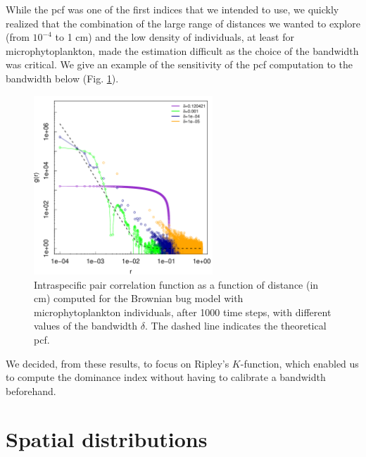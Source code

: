 \documentclass[english]{article}
\begin{document}
While the pcf was one of the first indices that we intended to use,
we quickly realized that the combination of the large range of distances
we wanted to explore (from $10^{-4}$ to 1 cm) and the low density
of individuals, at least for microphytoplankton, made the estimation
difficult as the choice of the bandwidth was critical. We give an
example of the sensitivity of the pcf computation to the bandwidth
below (Fig. \ref{fig:bandwidth_BBM}).

\begin{figure}[H]
\begin{centering}
\includegraphics[width=0.6\textwidth]{../code/figure/bandwidth_BBM}
\par\end{centering}
\caption{Intraspecific pair correlation function as a function of distance
(in cm) computed for the Brownian bug model with microphytoplankton
individuals, after 1000 time steps, with different values of the bandwidth
$\delta$. The dashed line indicates the theoretical pcf.\label{fig:bandwidth_BBM}
}
\end{figure}

We decided, from these results, to focus on Ripley's $K$-function,
which enabled us to compute the dominance index without having to
calibrate a bandwidth beforehand. 

\section{Spatial distributions}
\end{document}
